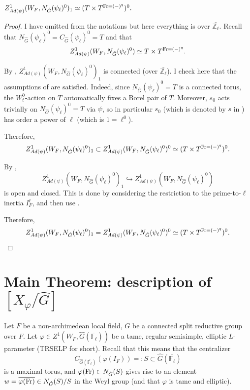 \begin{lemma}\label{Lem_Z^1()_1}
	$Z^1_{Ad(\psi)}(W_F, N_{\hat{G}}(\psi_{\ell})^0)_1 \simeq (T \times T^{\operatorname{Fr}=(-)^q})^0.$
\end{lemma}

\begin{proof}
	I have omitted from the notations but here everything is over $\overline{\mathbb{Z}_{\ell}}$.
	Recall that $N_{\hat{G}}(\psi_{\ell})^0=C_{\hat{G}}(\psi_{\ell})^0=T$ and that
	$$Z^1_{Ad(\psi)}(W_F, N_{\hat{G}}(\psi_{\ell})^0) \simeq T \times T^{\operatorname{Fr}=(-)^q}.$$
	
	By \cite[Section 5.4, 5.5]{dat2022ihes}, $Z^1_{Ad(\psi)}(W_F, N_{\hat{G}}(\psi_{\ell})^0)_1$ is connected (over $\overline{\mathbb{Z}_{\ell}}$). I check here that the assumptions of \cite[Section 5.4, 5.5]{dat2022ihes} are satisfied. Indeed, since $N_{\hat{G}}(\psi_{\ell})^0=T$ is a connected torus, the $W_t^0$-action on $T$ automatically fixes a Borel pair of $T$. Moreover, $s_0$ acts trivially on $N_{\hat{G}}(\psi_{\ell})^0=T$ via $\psi$, so in particular $s_0$ (which is denoted by $s$ in \cite[Section 5.5]{dat2022ihes}) has order a power of $\ell$ (which is $1 = \ell^0$).
	
	Therefore, 
	$$Z^1_{Ad(\psi)}(W_F, N_{\hat{G}}(\psi_{\ell})^0)_1 \subset Z^1_{Ad(\psi)}(W_F, N_{\hat{G}}(\psi_{\ell})^0)^0 \simeq (T \times T^{\operatorname{Fr}=(-)^q})^0.$$
	
	By \cite[Section 4.6]{dat2022ihes}, 
	$$Z^1_{Ad(\psi)}(W_F, N_{\hat{G}}(\psi_{\ell})^0)_1 \hookrightarrow Z^1_{Ad(\psi)}(W_F, N_{\hat{G}}(\psi_{\ell})^0)$$
	is open and closed. This is done by considering the restriction to the prime-to-$\ell$ inertia $I_F^{\ell}$, and then use \cite[Theorem 4.2]{dat2022ihes}.
	
	Therefore, 
	$$Z^1_{Ad(\psi)}(W_F, N_{\hat{G}}(\psi_{\ell})^0)_1 = Z^1_{Ad(\psi)}(W_F, N_{\hat{G}}(\psi_{\ell})^0)^0 \simeq (T \times T^{\operatorname{Fr}=(-)^q})^0.$$
	
\end{proof}




\section{Main Theorem: description of $[X_{\varphi}/\hat{G}]$}

Let $F$ be a non-archimedean local field, $G$ be a connected split reductive group over $F$. Let $\varphi \in Z^1(W_F, \hat{G}(\overline{\mathbb{F}_{\ell}}))$ be a tame, regular semisimple, elliptic $L$-parameter (TRSELP for short). Recall that this means that the centralizer 
$$C_{\hat{G}(\overline{\mathbb{F}_{\ell}})}(\varphi(I_F)) =: S \subset \hat{G}(\overline{\mathbb{F}_{\ell}})$$ 
is a maximal torus, and $\varphi(\operatorname{Fr}) \in N_{\hat{G}}(S)$ gives rise to an element $w=\overline{\varphi(\operatorname{Fr})} \in N_{\hat{G}}(S)/S$ in the Weyl group (and that $\varphi$ is tame and elliptic). 

